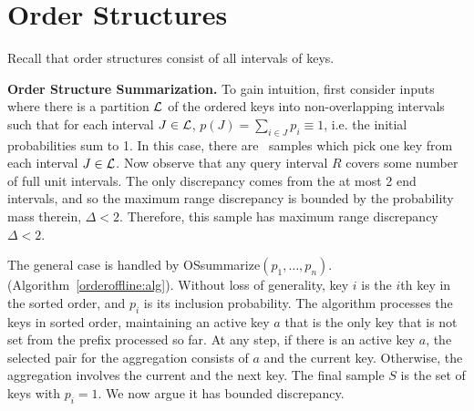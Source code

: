 \documentclass[11pt]{article}
\begin{document}
\section{Order Structures} \label{ordered:sec}
\noindent
Recall that order structures consist of all intervals of keys.

\noindent
{\bf Order Structure Summarization.}
 To gain intuition, first consider inputs where
there is a partition $\mathcal{L}$ of the ordered keys into 
non-overlapping intervals such that for each interval
$J\in\mathcal{L}$,  $p(J)=\sum_{i\in J} p_i \equiv 1$, i.e. the initial
probabilities sum to 1.
In this case, there are \varopt\ samples which pick one key from each 
interval $J \in \mathcal{L}$. 
Now observe that any query interval $R$ covers some number
of full unit intervals.
The only discrepancy comes from the at most 2 end intervals, and so
the maximum range discrepancy is bounded by the probability mass
therein,  $\Delta < 2$. 
Therefore, this sample has maximum range discrepancy $\Delta< 2$.  

The general case is handled by
{\sc OSsummarize}$(p_1,\ldots,p_n)$.
(Algorithm~\ref{orderoffline:alg}). 
Without loss of generality, key $i$ is the $i$th key in the sorted
order, and $p_i$ is its inclusion probability.
The algorithm processes the keys in sorted order, maintaining 
an active key $a$ that is the only key that is not set 
from the prefix processed so far.
 At any step, if there is an active key $a$, the selected pair for the
 aggregation consists of $a$ and the current key.  
Otherwise, the aggregation involves the current and the next key.
The final sample $S$ is the set of keys with  $p_i=1$.  
We now argue it has bounded discrepancy.
\end{document}
